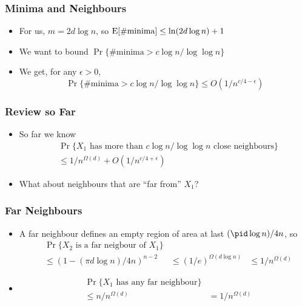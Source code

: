 \documentclass{beamer}
\begin{document}
\frame
{
  \frametitle{Minima and Neighbours}

   \begin{itemize}
     \item For us, $m=2d\log n$, so $\mathrm{E}[\mbox{\#minima}] \le \ln(2d\log n) +1$
     \item We want to bound $\Pr\{\mbox{\#minima} > c\log n/\log\log n\}$
     \item We get, for any $\epsilon > 0$,
       \[\Pr\{\mbox{\#minima} > c\log n/\log\log n\}
         \le O(1/n^{c/4-\epsilon}) \]
   \end{itemize}
}


\frame
{
  \frametitle{Review so Far}

   \begin{itemize}
     \item So far we know
       \[
         \begin{aligned}
          &\Pr\{\mbox{$X_1$ has more than $c\log n/\log\log n$ close neighbours}\} \\
          & \le 1/n^{\Omega(d)} + O(1/n^{c/4+\epsilon}) 
         \end{aligned}
       \]
     \item What about neighbours that are ``far from'' $X_1$?
   \end{itemize}
}


\frame
{
  \frametitle{Far Neighbours}

   \begin{itemize}
     \item A far neighbour defines an empty region of area at last
           $(\pid\log n)/4n$, so
       \[
         \begin{aligned}
          &\Pr\{\mbox{$X_2$ is a far neigbour of $X_1$}\} \\
          & \le (1-(\pi d\log n)/4n)^{n-2}
          & \le (1/e)^{\Omega(d\log n)}
          & \le 1/n^{\Omega(d)}
         \end{aligned}
       \]
      \item 
       \[
         \begin{aligned}
          &\Pr\{\mbox{$X_1$ has any far neighbour}\} \\
          & \le n/n^{\Omega(d)}
          & = 1/n^{\Omega(d)}
         \end{aligned}
       \]
   \end{itemize}
}
\end{document}
